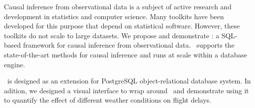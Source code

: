 Causal inference from observational data is a subject of active research and development in statistics and computer science. Many toolkits have been developed for this purpose that depend on statistical software.
However, these toolkits do not scale to large datasets.
We propose and demonstrate \GSQL: a SQL-based framework for causal inference from observational data.
\GSQL\ supports the state-of-the-art methods for causal inference and runs at scale within a database engine.
 \GSQL\ is designed as an extension for PostgreSQL object-relational database system. In adition, we designed a visual interface to wrap around \GSQL\  and demonstrate using it to quantify the effect of different weather conditions on flight delays. 